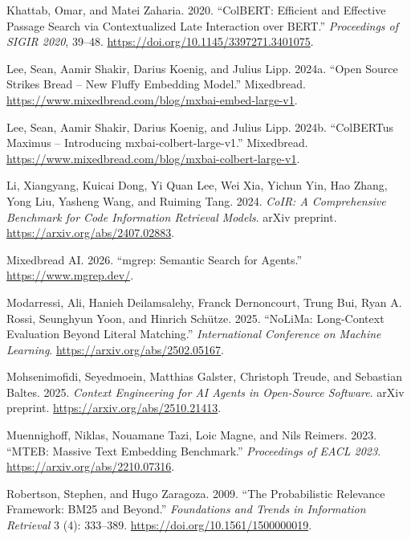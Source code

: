\documentclass[
  11pt,
  letterpaper,
  numbers=noendperiod,
  parskip=half]{scrartcl}
\newlength{\cslhangindent}
\newenvironment{CSLReferences}[2] %
 {\begin{list}{}{%
  \setlength{\itemindent}{0pt}
  \setlength{\leftmargin}{0pt}
  \setlength{\parsep}{0pt}
  \ifodd #1
   \setlength{\leftmargin}{\cslhangindent}
   \setlength{\itemindent}{-1\cslhangindent}
  \fi
  \setlength{\itemsep}{#2\baselineskip}}}
 {\end{list}}
\begin{document}
\begin{CSLReferences}{1}{1}
Khattab, Omar, and Matei Zaharia. 2020. {``{ColBERT}: Efficient and
Effective Passage Search via Contextualized Late Interaction over
BERT.''} \emph{Proceedings of SIGIR 2020}, 39--48.
\url{https://doi.org/10.1145/3397271.3401075}.

Lee, Sean, Aamir Shakir, Darius Koenig, and Julius Lipp. 2024a. {``Open
Source Strikes Bread -- New Fluffy Embedding Model.''} Mixedbread.
\url{https://www.mixedbread.com/blog/mxbai-embed-large-v1}.

Lee, Sean, Aamir Shakir, Darius Koenig, and Julius Lipp. 2024b.
{``ColBERTus Maximus -- Introducing mxbai-colbert-large-v1.''}
Mixedbread. \url{https://www.mixedbread.com/blog/mxbai-colbert-large-v1}.

Li, Xiangyang, Kuicai Dong, Yi Quan Lee, Wei Xia, Yichun Yin, Hao Zhang,
Yong Liu, Yasheng Wang, and Ruiming Tang. 2024. \emph{{CoIR}: A
Comprehensive Benchmark for Code Information Retrieval Models}. arXiv
preprint. \url{https://arxiv.org/abs/2407.02883}.

Mixedbread AI. 2026. {``mgrep: Semantic Search for Agents.''}
\url{https://www.mgrep.dev/}.

Modarressi, Ali, Hanieh Deilamsalehy, Franck Dernoncourt, Trung Bui,
Ryan A. Rossi, Seunghyun Yoon, and Hinrich Schütze. 2025.
{``NoLiMa: Long-Context Evaluation Beyond Literal Matching.''}
\emph{International Conference on Machine Learning}.
\url{https://arxiv.org/abs/2502.05167}.

Mohsenimofidi, Seyedmoein, Matthias Galster, Christoph Treude, and
Sebastian Baltes. 2025. \emph{Context Engineering for AI Agents in
Open-Source Software}. arXiv preprint.
\url{https://arxiv.org/abs/2510.21413}.

Muennighoff, Niklas, Nouamane Tazi, Loic Magne, and Nils Reimers. 2023.
{``{MTEB}: Massive Text Embedding Benchmark.''} \emph{Proceedings of
EACL 2023}. \url{https://arxiv.org/abs/2210.07316}.

Robertson, Stephen, and Hugo Zaragoza. 2009. {``The Probabilistic
Relevance Framework: {BM25} and Beyond.''} \emph{Foundations and Trends
in Information Retrieval} 3 (4): 333--389.
\url{https://doi.org/10.1561/1500000019}.


\end{CSLReferences}
\end{document}
